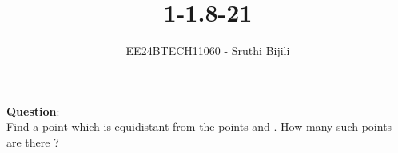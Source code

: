 \documentclass[journal]{IEEEtran}
\begin{document}

\vspace{3cm}

\title{1-1.8-21}
\author{EE24BTECH11060 - Sruthi Bijili}
{\let\newpage\relax\maketitle}

\renewcommand{\thefigure}{\theenumi}
\renewcommand{\thetable}{\theenumi}
\setlength{\intextsep}{10pt} %


\renewcommand{\thetable}{\theenumi}

\textbf{Question}:\\
Find a point which is equidistant from the points  and . How many such points are there ?
\end{document}
